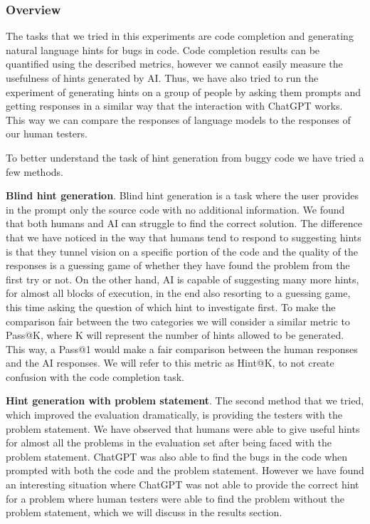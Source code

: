 \documentclass[12pt,a4paper]{report}
\begin{document}
\subsubsection{Overview}

The tasks that we tried in this experiments are code completion and generating natural language hints for bugs in code. Code completion results can be quantified using the described metrics, however we cannot easily measure the usefulness of hints generated by AI. Thus, we have also tried to run the experiment of generating hints on a group of people by asking them prompts and getting responses in a similar way that the interaction with ChatGPT works. This way we can compare the responses of language models to the responses of our human testers.

To better understand the task of hint generation from buggy code we have tried a few methods.

\textbf{Blind hint generation}. Blind hint generation is a task where the user provides in the prompt only the source code with no additional information. We found that both humans and AI can struggle to find the correct solution. The difference that we have noticed in the way that humans tend to respond to suggesting hints is that they tunnel vision on a specific portion of the code and the quality of the responses is a guessing game of whether they have found the problem from the first try or not. On the other hand, AI is capable of suggesting many more hints, for almost all blocks of execution, in the end also resorting to a guessing game, this time asking the question of which hint to investigate first. To make the comparison fair between the two categories we will consider a similar metric to Pass@K, where K will represent the number of hints allowed to be generated. This way, a Pass@1 would make a fair comparison between the human responses and the AI responses. We will refer to this metric as Hint@K, to not create confusion with the code completion task.

\textbf{Hint generation with problem statement}. The second method that we tried, which improved the evaluation dramatically, is providing the testers with the problem statement. We have observed that humans were able to give useful hints for almost all the problems in the evaluation set after being faced with the problem statement. ChatGPT was also able to find the bugs in the code when prompted with both the code and the problem statement. However we have found an interesting situation where ChatGPT was not able to provide the correct hint for a problem where human testers were able to find the problem without the problem statement, which we will discuss in the results section.
\end{document}
